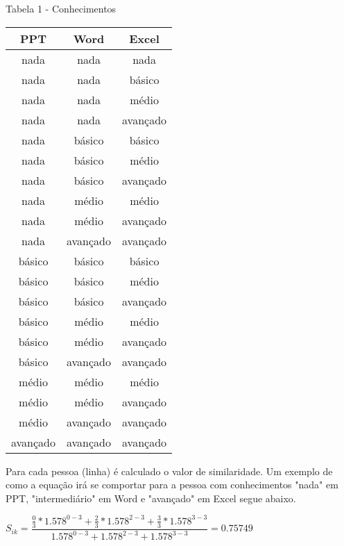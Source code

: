 \documentclass[]{article}
\begin{document}
		\begin{center}
			Tabela 1 - Conhecimentos
			
			\begin{tabular}{|c c c|} 
				\hline
				PPT & Word & Excel \\ [0.5ex] 
				\hline\hline
				nada & nada & nada \\
				\hline
				nada & nada & básico \\
				\hline
				nada & nada & médio \\
				\hline
				nada & nada & avançado \\
				\hline
				nada & básico & básico \\
				\hline
				nada & básico & médio \\
				\hline
				nada & básico & avançado \\
				\hline
				nada & médio & médio \\
				\hline
				nada & médio & avançado \\
				\hline
				nada & avançado & avançado \\
				\hline
				básico & básico & básico \\
				\hline
				básico & básico & médio \\
				\hline
				básico & básico & avançado \\
				\hline
				básico & médio & médio \\
				\hline
				básico & médio & avançado \\
				\hline
				básico & avançado & avançado \\
				\hline
				médio & médio & médio \\
				\hline
				médio & médio & avançado \\
				\hline
				médio & avançado & avançado \\
				\hline
				avançado & avançado & avançado \\
				\hline
			\end{tabular}
		\end{center}
		
		Para cada pessoa (linha) é calculado o valor de similaridade. Um exemplo de como a equação irá se comportar para a pessoa com conhecimentos "nada" em PPT, "intermediário" em Word e "avançado" em Excel segue abaixo.
		
		\begin{center}
		$ S_{ik} = \dfrac{\frac{0}{3} * 1.578^{0 - 3} + \frac{2}{3} * 1.578^{2 - 3} + \frac{3}{3} * 1.578^{3 - 3}}        
		           {1.578^{0 - 3} + 1.578^{2 - 3} + 1.578^{3 - 3}} = 0.75749   {}$
		           
		 		
		\end{center}
\end{document}
